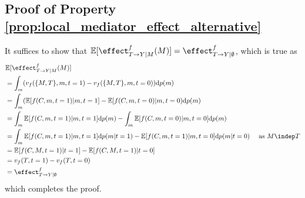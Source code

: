 \subsection{Proof of Property \ref{prop:local_mediator_effect_alternative}}
\label{proof:local_mediator_effect_alternative}
It suffices to show that $\mathbb{E}[\effect^{f}_{T \rightarrow Y | M}(M)] = \effect^{f}_{T \rightarrow Y | \emptyset}$, which is true as
\begin{align*}
    &\mathbb{E}[\effect^f_{T \rightarrow Y | M}(M)] \\
    &= \int_{m} (v_f(\{M, T\} , m, t=1) - v_f(\{M, T\} , m, t=0)) \text{d}p(m) \\
        &= \int_{m} (\mathbb{E}[f(C,m,t=1) | m, t=1] - \mathbb{E}[f(C,m,t=0) | m, t=0) \text{d}p(m) \\
    &= \int_{m} \mathbb{E}[f(C,m,t=1) | m, t=1]\text{d}p(m) - \int_{m}\mathbb{E}[f(C,m,t=0) | m, t=0]\text{d}p(m) \\
    &= \int_{m} \mathbb{E}[f(C,m,t=1) | m, t=1]\text{d}p(m|t=1) - \mathbb{E}[f(C,m,t=1) | m, t=0]\text{d}p(m|t=0) \ \ \ \text{ as } M \indep T  \\
        &= \mathbb{E}[f(C,M,t=1) | t=1] - \mathbb{E}[f(C,M,t=1) | t=0] \\
        &=  v_f(T, t=1) - v_f(T, t=0) \\
    &= \effect^{f}_{T \rightarrow Y | \emptyset} 
\end{align*}
which completes the proof.



\vfill


